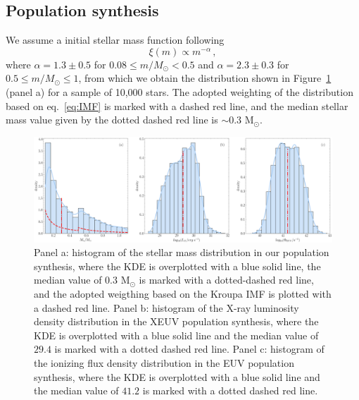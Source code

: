 \documentclass[fleqn,usenatbib,letters]{mnras}
\begin{document}


\subsection{Population synthesis}

We assume a initial stellar mass function following \citet{Kroupa2001}
\begin{equation} \label{eq:IMF}
    \xi(m) \propto m^{-\alpha} \,,
\end{equation}
where $\alpha = 1.3 \pm 0.5$ for $0.08 \leq m/M_\odot < 0.5$ and $\alpha = 2.3 \pm 0.3$ for $0.5 \leq m/M_\odot \leq 1$, from which we obtain the distribution shown in Figure~\ref{fig:hist} (panel a) for a sample of 10,000 stars. The adopted weighting of the distribution based on eq.~\ref{eq:IMF} is marked with a dashed red line, and the median stellar mass value given by the dotted dashed red line is $\sim 0.3$ M$_\odot$.
\begin{figure}
    \includegraphics[width=\textwidth]{Fig1}
    \caption{Panel a: histogram of the stellar mass distribution in our population synthesis, where the KDE is overplotted with a blue solid line, the median value of $0.3$ M$_\odot$ is marked with a dotted-dashed red line, and the adopted weigthing based on the Kroupa IMF is plotted with a dashed red line. Panel b: histogram of the X-ray luminosity density distribution in the XEUV population synthesis, where the KDE is overplotted with a blue solid line and the median value of $29.4$ is marked with a dotted dashed red line. Panel c: histogram of the ionizing flux density distribution in the EUV population synthesis, where the KDE is overplotted with a blue solid line and the median value of $41.2$ is marked with a dotted dashed red line.\label{fig:hist}}
\end{figure}
\end{document}

